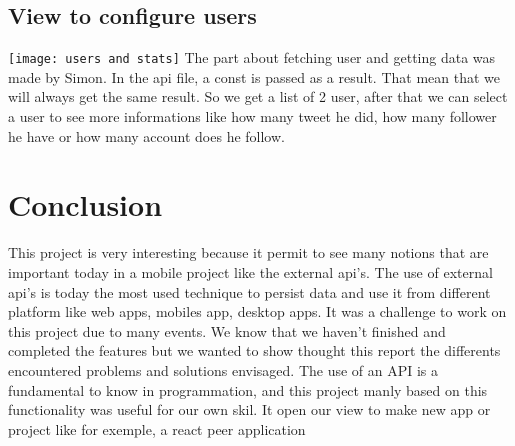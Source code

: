 \documentclass{article}
\begin{document}
\subsection{View to configure users}
\texttt{[image: users and stats]}
The part about fetching user and getting data was made by Simon. In the api file, a const is passed as a result. That mean that we will always get the same result. So we get a list of 2 user, after that we can select a user to see more informations like how many tweet he did, how many follower he have or how many account does he follow.


\section{Conclusion}
This project is very interesting because it permit to see many notions that are important today in a mobile project like the external api's. The use of external api's is today the most used technique to persist data and use it from different platform like web apps, mobiles app, desktop apps. It was a challenge to work on this project due to many events. We know that we haven't finished and completed the features but we wanted to show thought this report the differents encountered problems and solutions envisaged.
The use of an API is a fundamental to know in programmation, and this project manly based on this functionality was useful for our own skil.
It open our view to make new app or project like for exemple, a react peer application
\end{document}
